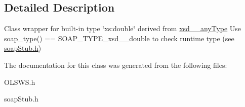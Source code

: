 \subsection{Detailed Description}
Class wrapper for built-\/in type \char`\"{}xs:double\char`\"{} derived from \hyperlink{classxsd____anyType}{xsd\_\-\_\-anyType} Use soap\_\-type() == SOAP\_\-TYPE\_\-xsd\_\-\_\-double to check runtime type (see \hyperlink{soapStub_8h_source}{soapStub.h}) 

The documentation for this class was generated from the following files:\begin{DoxyCompactItemize}
\item 
OLSWS.h\item 
soapStub.h\end{DoxyCompactItemize}
